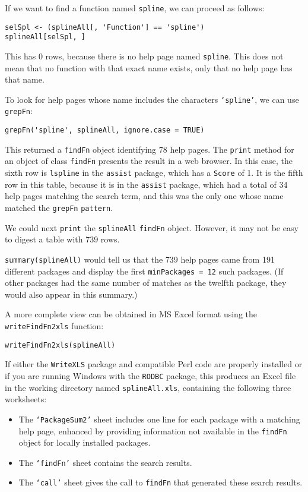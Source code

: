 If we want to find a function named {\tt spline}, we can
proceed as follows:
\begin{verbatim}
selSpl <- (splineAll[, 'Function'] == 'spline')
splineAll[selSpl, ]
\end{verbatim}
This has 0 rows, because there is no help page named
{\tt spline}.  This does not mean that no function
with that exact name exists, only that no help page
has that name.  

To look for help pages whose name includes the characters
{\tt `spline'}, we can use {\tt grepFn}:
\begin{verbatim}
grepFn('spline', splineAll, ignore.case = TRUE)
\end{verbatim}
This returned a {\tt findFn} object identifying 78 help pages.
The {\tt print} method for an object of class {\tt findFn}
presents the result in a web browser.  In this case,
the sixth row is {\tt lspline} in the
{\tt assist} package, which has a {\tt Score} of 1.  It
is the fifth row in this table, because it is in the
{\tt assist} package, which had a total of 34 help
pages matching the search term, and this was the only
one whose name matched the {\tt grepFn} {\tt pattern}.

We could next {\tt print} the {\tt splineAll} {\tt findFn}
object.  However, it may not be easy to digest a table 
with 739 rows.

{\tt summary(splineAll)} would tell us that the 739 help pages
came from 191 different packages and display the first
{\tt minPackages = 12} such packages.
(If other packages had the same number of
matches as the twelfth package, they would also appear in this
summary.)

A more complete view can be obtained in MS Excel format
using the {\tt writeFindFn2xls} function:
\begin{verbatim}
writeFindFn2xls(splineAll)
\end{verbatim}
If either the {\tt WriteXLS} package and compatible Perl code
are properly installed or if you are running Windows with
the {\tt RODBC} package, this produces an Excel file in the
working directory named {\tt splineAll.xls}, containing the
following three worksheets:

\begin{itemize}
\item{The {\tt `PackageSum2'} sheet includes one line for each
package with a matching help page, enhanced by providing 
information not available in the {\tt findFn} object 
for locally installed packages.}
\item{The {\tt `findFn'} sheet contains the search results.}
\item{The {\tt `call'} sheet gives the call to {\tt findFn}
that generated these search results.}
\end{itemize}

